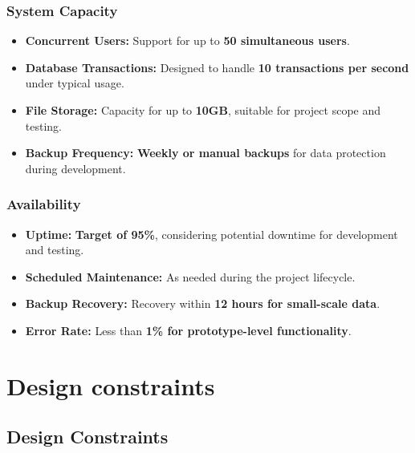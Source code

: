 \subsubsection*{System Capacity}
\begin{itemize}
    \item \textbf{Concurrent Users:} Support for up to \textbf{50 simultaneous users}.
    \item \textbf{Database Transactions:} Designed to handle \textbf{10 transactions per second} under typical usage.
    \item \textbf{File Storage:} Capacity for up to \textbf{10GB}, suitable for project scope and testing.
    \item \textbf{Backup Frequency:} \textbf{Weekly or manual backups} for data protection during development.
\end{itemize}

\subsubsection*{Availability}
\begin{itemize}
    \item \textbf{Uptime:} \textbf{Target of 95\%}, considering potential downtime for development and testing.
    \item \textbf{Scheduled Maintenance:} As needed during the project lifecycle.
    \item \textbf{Backup Recovery:} Recovery within \textbf{12 hours for small-scale data}.
    \item \textbf{Error Rate:} Less than \textbf{1\% for prototype-level functionality}.
\end{itemize}


\newpage
\section{Design constraints}
\label{sec:design_constraints}%


\subsection{Design Constraints}
\label{subsec:design_constraints}

